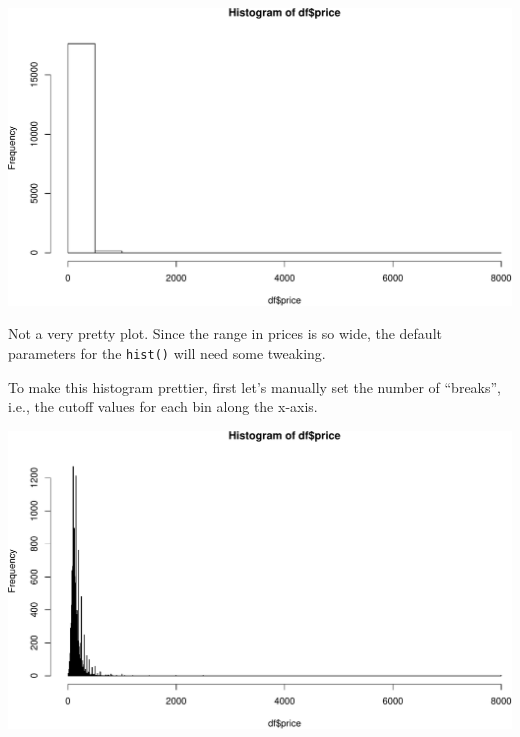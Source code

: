 \documentclass[
]{book}
\newenvironment{Shaded}{\begin{snugshade}}{\end{snugshade}}
\newcommand{\AttributeTok}[1]{\textcolor[rgb]{0.77,0.63,0.00}{#1}}
\newcommand{\CommentTok}[1]{\textcolor[rgb]{0.56,0.35,0.01}{\textit{#1}}}
\newcommand{\DecValTok}[1]{\textcolor[rgb]{0.00,0.00,0.81}{#1}}
\newcommand{\FunctionTok}[1]{\textcolor[rgb]{0.00,0.00,0.00}{#1}}
\newcommand{\NormalTok}[1]{#1}
\newcommand{\OtherTok}[1]{\textcolor[rgb]{0.56,0.35,0.01}{#1}}
\newcommand{\SpecialCharTok}[1]{\textcolor[rgb]{0.00,0.00,0.00}{#1}}
\begin{document}
\includegraphics{figures/unnamed-chunk-213-1.pdf}

Not a very pretty plot. Since the range in prices is so wide, the default parameters for the \texttt{hist()} will need some tweaking.

To make this histogram prettier, first let's manually set the number of ``breaks'', i.e., the cutoff values for each bin along the x-axis.

\begin{Shaded}
\end{Shaded}

\includegraphics{figures/unnamed-chunk-214-1.pdf}
\end{document}
